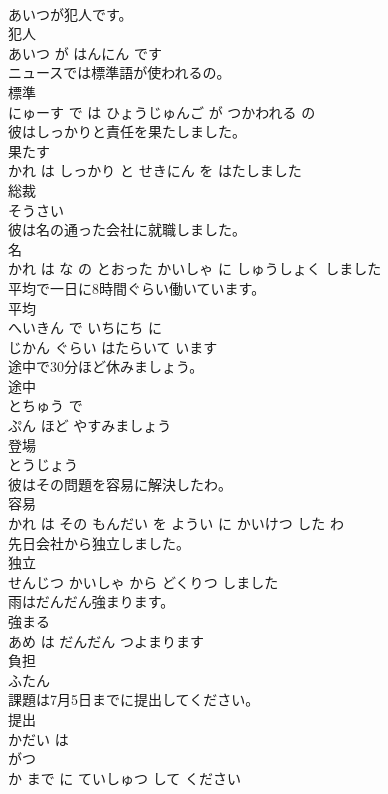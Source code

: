 \documentclass[8pt]{extreport}
\begin{document}
\begin{CJK}{UTF8}{min}
\\	あいつが犯人です。	
\\	犯人 
\\	あいつ が はんにん です			
\\	ニュースでは標準語が使われるの。	
\\	標準 
\\	にゅーす で は ひょうじゅんご が つかわれる の			
\\	彼はしっかりと責任を果たしました。	
\\	果たす 
\\	かれ は しっかり と せきにん を はたしました			
\\	総裁	
\\	そうさい			
\\	彼は名の通った会社に就職しました。	
\\	名 
\\	かれ は な の とおった かいしゃ に しゅうしょく しました			
\\	平均で一日に8時間ぐらい働いています。	
\\	平均 
\\	へいきん で いちにち に 
\\	じかん ぐらい はたらいて います			
\\	途中で30分ほど休みましょう。	
\\	途中 
\\	とちゅう で 
\\	ぷん ほど やすみましょう			
\\	登場	
\\	とうじょう			
\\	彼はその問題を容易に解決したわ。	
\\	容易 
\\	かれ は その もんだい を ようい に かいけつ した わ			
\\	先日会社から独立しました。	
\\	独立 
\\	せんじつ かいしゃ から どくりつ しました			
\\	雨はだんだん強まります。	
\\	強まる 
\\	あめ は だんだん つよまります			
\\	負担	
\\	ふたん			
\\	課題は7月5日までに提出してください。	
\\	提出 
\\	かだい は 
\\	がつ 
\\	か まで に ていしゅつ して ください			

\end{CJK}
\end{document}
